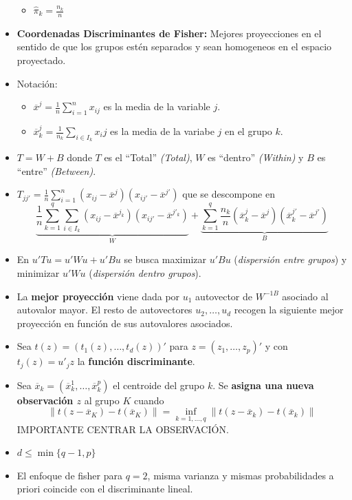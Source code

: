 \begin{itemize}
\begin{itemize}
        \item $\hat{\pi}_k=\frac{n_k}{n}$
    \end{itemize}
    \item \textbf{Coordenadas Discriminantes de Fisher:} Mejores proyecciones en el sentido de que los grupos estén separados y sean homogeneos en el espacio proyectado.
    \item Notación:
    \begin{itemize}
        \item $\overline{x}^j=\frac{1}{n}\sum_{i=1}^nx_{ij}$ es la media de la variable $j$.
        \item $\overline{x}^j_k=\frac{1}{n_k}\sum_{i\in I_k}x_ij$ es la media de la variabe $j$ en el grupo $k$.
    \end{itemize}
    \item $T=W+B$ donde $T$ es el ``Total'' \textit{(Total)}, $W$ es ``dentro'' \textit{(Within)} y $B$ es ``entre'' \textit{(Between)}.
    \item $T_{jj'}=\frac{1}{n}\sum_{i=1}^n(x_{ij}-\overline{x}^j)(x_{ij'}-\overline{x}^{j'})$ que se descompone en
    \[
        \underbrace{\frac{1}{n}\sum_{k=1}^q\sum_{i\in I_k}(x_{ij}-\overline{x}^{j_k})(x_{ij'}-\overline{x}^{j'_k})}_W + \underbrace{\sum_{k=1}^q\frac{n_k}{n}(\overline{x}^j_k-\overline{x}^j)(\overline{x}^{j'}_k-\overline{x}^{j'})}_B
    \]
    \item En $u'Tu=u'Wu+u'Bu$ se busca maximizar $u'Bu$ (\textit{dispersión entre grupos}) y minimizar $u'Wu$ (\textit{dispersión dentro grupos}).
    \item La \textbf{mejor proyección} viene dada por $u_1$ autovector de $W^{-1B}$ asociado al autovalor mayor. El resto de autovectores $u_2,\dots,u_d$ recogen la siguiente mejor proyección en función de sus autovalores asociados.
    \item Sea $t(z)=(t_1(z),\dots,t_d(z))'$ para $z=(z_1,\dots,z_p)'$ y con $t_j(z)=u'_jz$ la \textbf{función discriminante}.
    \item Sea $\overline{x}_k=(\overline{x}^1_k,\dots,\overline{x}^p_k)$ el centroide del grupo $k$. Se \textbf{asigna una nueva observación $z$} al grupo $K$ cuando
    \[
        \|t(z-\overline{x}_K)-t(\overline{x}_K)\|=\inf_{k=1,\dots,q}\|t(z-\overline{x}_k)-t(\overline{x}_k)\|
    \]
    IMPORTANTE CENTRAR LA OBSERVACIÓN.
    \item $d\leq \min\{q-1,p\}$
    \item El enfoque de fisher para $q=2$, misma varianza y mismas probabilidades a priori coincide con el discriminante lineal.

\end{itemize}
